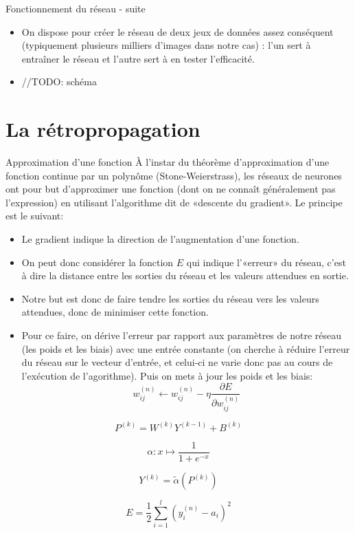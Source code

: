 \documentclass[ignorenonframetext,]{beamer}
\begin{document}
\begin{frame}{Fonctionnement du réseau - suite}
	\begin{itemize}
		\item On dispose pour créer le réseau de deux jeux de données assez conséquent (typiquement plusieurs milliers d'images dans notre cas) : l'un sert à entraîner le réseau et l'autre sert à en tester l'efficacité.
		\item //TODO: schéma			
	\end{itemize}
\end{frame}

\section{La rétropropagation}
\begin{frame}{Approximation d'une fonction}
	À l'instar du théorème d'approximation d'une fonction continue par un polynôme (Stone-Weierstrass), les réseaux de neurones ont pour but d'approximer une fonction (dont on ne connaît généralement pas l'expression) en utilisant l'algorithme dit de «descente du gradient». Le principe est le suivant:
	\begin{itemize}
		\item Le gradient indique la direction de l'augmentation d'une fonction.
		\item On peut donc considérer la fonction $E$ qui indique l'«erreur» du réseau, c'est à dire la distance entre les sorties du réseau et les valeurs attendues en sortie.
		\item Notre but est donc de faire tendre les sorties du réseau vers les valeurs attendues, donc de minimiser cette fonction.
		\item Pour ce faire, on dérive l'erreur par rapport aux paramètres de notre réseau (les poids et les biais) avec une entrée constante (on cherche à réduire l'erreur du réseau sur le vecteur d'entrée, et celui-ci ne varie donc pas au cours de l'exécution de l'agorithme). Puis on mets à jour les poids et les biais:
		\[ w_{ij}^{(n)} \longleftarrow w_{ij}^{(n)} - \eta \frac{\partial{E}}{\partial{w_{ij}^{(n)}}} \]
	\end{itemize}
\end{frame}

\frame{\sectionpage}
\begin{frame}{}

\[ P^{(k)} = W^{(k)}Y^{(k-1)}+B^{(k)}  \]

\[ \alpha : x \mapsto \frac{1}{1+e^{-x}} \]

\[ Y^{(k)} = \tilde\alpha(P^{(k)}) \]

\[ E = \frac{1}{2} \sum_{i=1}^l (y_i^{(n)}-a_i)^2 \]

\end{frame}
\end{document}

